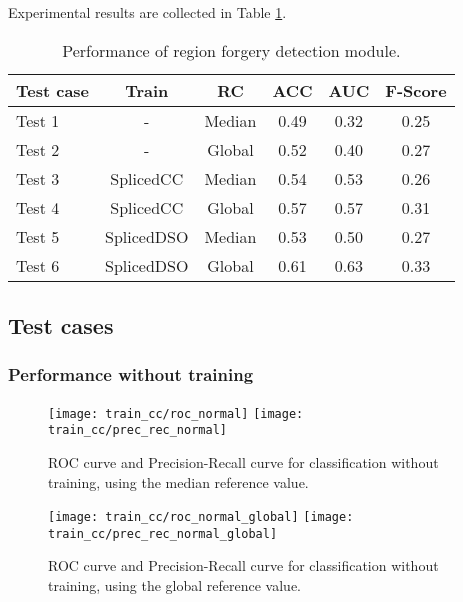 Experimental results are collected in Table \ref{table:performanceregionaldet}.

\begin{table}[h!]
\centering
\begin{tabular}{l c c c c c} 
\hline \hline 
\textbf{Test case} & \textbf{Train} & \textbf{RC} & \textbf{ACC} & \textbf{AUC} &\textbf{ F-Score} \\ [0.5ex]
\hline
Test 1 & - & Median & 0.49 & 0.32 & 0.25\\
Test 2 & - & Global & 0.52 & 0.40 & 0.27\\
Test 3 & SplicedCC & Median & 0.54 & 0.53 & 0.26\\
Test 4 & SplicedCC & Global & 0.57 & 0.57 & 0.31\\
Test 5 &	 SplicedDSO & Median & 0.53 & 0.50 & 0.27\\
Test 6 &	 SplicedDSO & Global & 0.61 & 0.63 & 0.33\\ [1ex]
\hline
\end{tabular}
\caption{Performance of region forgery detection module.}
\label{table:performanceregionaldet}
\end{table}

\subsection{Test cases}

\subsubsection{Performance without training}

\begin{figure}[!htb]
  \texttt{[image: train\_cc/roc\_normal]}
\endminipage\hfill
{}
  \texttt{[image: train\_cc/prec\_rec\_normal]}
\endminipage
\caption{ROC curve and Precision-Recall curve for classification without training, using the median reference value.}\label{fig:regiondetnormal}
\end{figure}

\begin{figure}[!htb]
  \texttt{[image: train\_cc/roc\_normal\_global]}
\endminipage\hfill
{}
  \texttt{[image: train\_cc/prec\_rec\_normal\_global]}
\endminipage
\caption{ROC curve and Precision-Recall curve for classification without training, using the global reference value.}\label{fig:regiondetnormal}
\end{figure}

